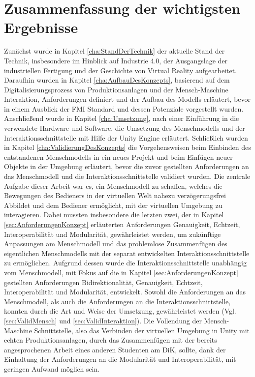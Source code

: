 \section{Zusammenfassung der wichtigsten Ergebnisse}\label{sec:ZusammenfassungErgebnisse}
Zunächst wurde in Kapitel \ref{cha:StandDerTechnik} der aktuelle Stand der Technik, insbesondere im Hinblick auf Industrie 4.0, der Ausgangslage der industriellen Fertigung und der Geschichte von Virtual Reality aufgearbeitet.
Daraufhin wurden in Kapitel \ref{cha:AufbauDesKonzepts}, basierend auf dem Digitalisierungsprozess von Produktionsanlagen und der Mensch-Maschine Interaktion, Anforderungen definiert und der Aufbau des Modells erläutert, bevor in einem Ausblick der FMI Standard und dessen Potenziale vorgestellt wurden.
Anschließend wurde in Kapitel \ref{cha:Umsetzung}, nach einer Einführung in die verwendete Hardware und Software, die Umsetzung des Menschmodells und der Interaktionsschnittstelle mit Hilfe der Unity Engine erläutert. 
Schließlich wurden in Kapitel \ref{cha:ValidierungDesKonzepts} die Vorgehensweisen beim Einbinden des entstandenen Menschmodells in ein neues Projekt und beim Einfügen neuer Objekte in der Umgebung erläutert, bevor die zuvor gestellten Anforderungen an das Menschmodell und die Interaktionsschnittstelle validiert wurden.
\newline\newline
Die zentrale Aufgabe dieser Arbeit war es, ein Menschmodell zu schaffen, welches die Bewegungen des Bedieners in der virtuellen Welt nahezu verzögerungsfrei Abbildet und dem Bediener ermöglicht, mit der virtuellen Umgebung zu interagieren. Dabei mussten insbesondere die letzten zwei, der in Kapitel \ref{sec:AnforderungenKonzept} erläuterten Anforderungen Genauigkeit, Echtzeit, Interoperabilität und Modularität, gewährleistet werden, um zukünftige Anpassungen am Menschmodell und das problemlose Zusammenfügen des eigentlichen Menschmodells mit der separat entwickelten Interaktionsschnittstelle zu ermöglichen.
Aufgrund dessen wurde die Interaktionsschnittstelle unabhängig vom Menschmodell, mit Fokus auf die in Kapitel \ref{sec:AnforderungenKonzept} gestellten Anforderungen Bidirektionalität, Genauigkeit, Echtzeit, Interoperabilität und Modularität, entwickelt. Sowohl die Anforderungen an das Menschmodell, als auch die Anforderungen an die Interaktionsschnittstelle, konnten durch die Art und Weise der Umsetzung, gewährleistet werden (Vgl. \ref{sec:ValidMensch} und \ref{sec:ValidInteraktion}).
Die Vollendung der Mensch-Maschine Schnittstelle, also das Verbinden der virtuellen Umgebung in Unity mit echten Produktionsanlagen, durch das Zusammenfügen mit der bereits angesprochenen Arbeit eines anderen Studenten am DiK, sollte, dank der Einhaltung der Anforderungen an die Modularität und Interoperabilität, mit geringen Aufwand möglich sein.
